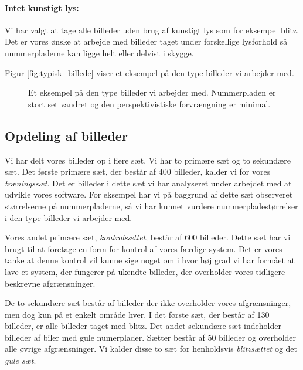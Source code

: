 \paragraph{Intet kunstigt lys:}
Vi har valgt at tage alle billeder uden brug af kunstigt lys som for eksempel blitz. Det er vores ønske at arbejde med billeder taget under forskellige lysforhold så nummerpladerne kan ligge helt eller delvist i skygge.  

Figur \vref{fig:typisk_billede} viser et eksempel på den type billeder vi arbejder med.

\begin{figure}[htp]
\centering
{} 
\caption{Et eksempel på den type billeder vi arbejder med. Nummerpladen er stort set vandret og den perspektivistiske forvrængning er minimal.}
\label{fig:typisk_billede}
\end{figure}

\subsection{Opdeling af billeder}
Vi har delt vores billeder op i flere sæt. Vi har to primære sæt og to sekundære sæt. Det første primære sæt, der består af 400 billeder, kalder vi for vores \textit{træningssæt}. Det er billeder i dette sæt vi har analyseret under arbejdet med at udvikle vores software. For eksempel har vi på baggrund af dette sæt observeret størrelserne på nummerpladerne, så vi har kunnet vurdere nummerpladestørrelser i den type billeder vi arbejder med.

Vores andet primære sæt, \textit{kontrolsættet}, består af 600 billeder. Dette sæt har vi brugt til at foretage en form for kontrol af vores færdige system. Det er vores tanke at denne kontrol vil kunne sige noget om i hvor høj grad vi har formået at lave et system, der fungerer på ukendte billeder, der overholder vores tidligere beskrevne afgrænsninger. 

De to sekundære sæt består af billeder der ikke overholder vores afgrænsninger, men dog kun på et enkelt område hver. I det første sæt, der består af 130 billeder, er alle billeder taget med blitz. Det andet sekundære sæt indeholder billeder af biler med gule numerplader. Sætter består af 50 billeder og overholder alle øvrige afgrænsninger. Vi kalder disse to sæt for henholdsvis \textit{blitzsættet} og det \textit{gule sæt}.

